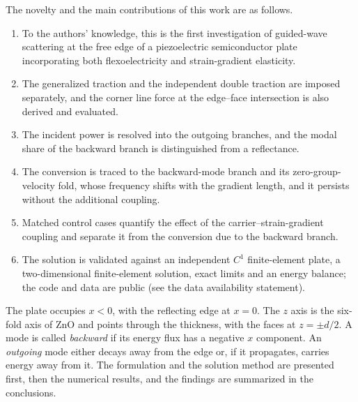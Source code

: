The novelty and the main contributions of this work are as follows.
\begin{enumerate}\setlength{\itemsep}{0pt}\setlength{\parskip}{0pt}\setlength{\topsep}{2pt}
\item To the authors' knowledge, this is the first investigation of guided-wave scattering at the free edge of a piezoelectric semiconductor plate incorporating both flexoelectricity and strain-gradient elasticity.
\item The generalized traction and the independent double traction are imposed separately, and the corner line force at the edge--face intersection is also derived and evaluated.
\item The incident power is resolved into the outgoing branches, and the modal share of the backward branch is distinguished from a reflectance.
\item The conversion is traced to the backward-mode branch and its zero-group-velocity fold, whose frequency shifts with the gradient length, and it persists without the additional coupling.
\item Matched control cases quantify the effect of the carrier--strain-gradient coupling and separate it from the conversion due to the backward branch.
\item The solution is validated against an independent $C^{1}$ finite-element plate, a two-dimensional finite-element solution, exact limits and an energy balance; the code and data are public (see the data availability statement).
\end{enumerate}

The plate occupies $x<0$, with the reflecting edge at $x=0$.  The $z$ axis is the six-fold axis of ZnO and points through the thickness, with the faces at $z=\pm d/2$.  A mode is called \emph{backward} if its energy flux has a negative $x$ component.  An \emph{outgoing} mode either decays away from the edge or, if it propagates, carries energy away from it.  The formulation and the solution method are presented first, then the numerical results, and the findings are summarized in the conclusions.

